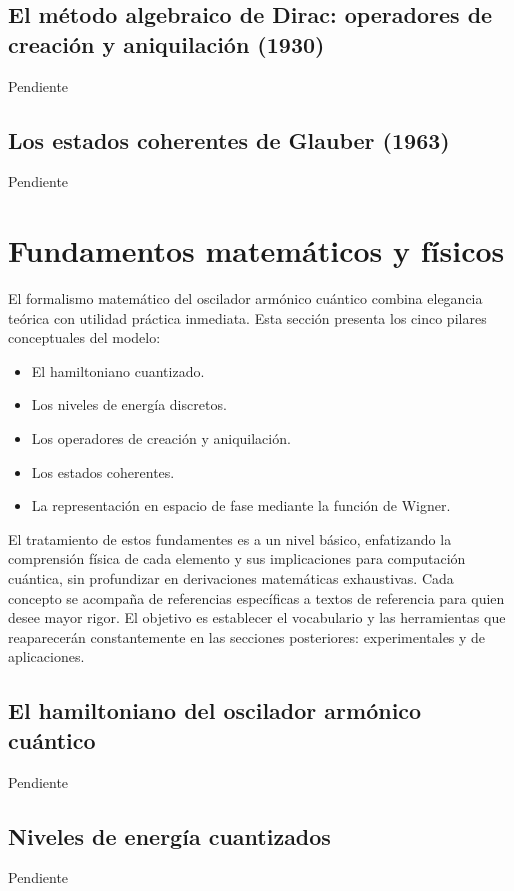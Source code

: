 \documentclass[11pt,a4paper,spanish]{book}
\begin{document}
\subsection*{El método algebraico de Dirac: operadores de creación y aniquilación (1930)}
Pendiente


\subsection*{Los estados coherentes de Glauber (1963)}
Pendiente


\section{Fundamentos matemáticos y físicos}

El formalismo matemático del oscilador armónico cuántico combina elegancia teórica con utilidad práctica inmediata. Esta sección presenta los cinco pilares conceptuales del modelo: 

\begin{itemize}
	\item El hamiltoniano cuantizado.
	\item Los niveles de energía discretos.
	\item Los operadores de creación y aniquilación.
	\item Los estados coherentes.
	\item La representación en espacio de fase mediante la función de Wigner.
\end{itemize}

El tratamiento de estos fundamentes es a un nivel básico, enfatizando la comprensión física de cada elemento y sus implicaciones para computación cuántica, sin profundizar en derivaciones matemáticas exhaustivas. Cada concepto se acompaña de referencias específicas a textos de referencia para quien desee mayor rigor. El objetivo es establecer el vocabulario y las herramientas que reaparecerán constantemente en las secciones posteriores: experimentales y de aplicaciones.

\subsection*{El hamiltoniano del oscilador armónico cuántico}
Pendiente

\subsection*{Niveles de energía cuantizados}
Pendiente
\end{document}
